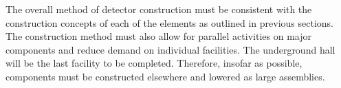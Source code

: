 




The overall method of detector construction must be consistent with the construction concepts of each of the elements as outlined in previous sections. The construction method must also allow for parallel activities on major components and reduce demand on individual facilities. The underground hall will be the last facility to be completed. Therefore, insofar as possible, components must be constructed elsewhere and lowered as large assemblies.

